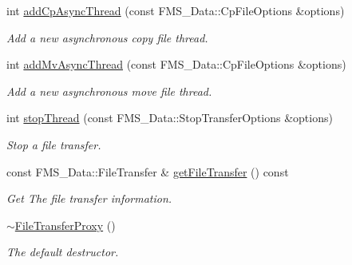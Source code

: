 \begin{DoxyCompactItemize}
int \hyperlink{classFileTransferProxy_a787ee7b8a04b450a0e11fea0d4cf9bb4}{addCpAsyncThread} (const FMS\_\-Data::CpFileOptions \&options)
\begin{DoxyCompactList}\small\item\em Add a new asynchronous copy file thread. \item\end{DoxyCompactList}\item 
int \hyperlink{classFileTransferProxy_a42b158cebb919a88d00d3c21c2c22093}{addMvAsyncThread} (const FMS\_\-Data::CpFileOptions \&options)
\begin{DoxyCompactList}\small\item\em Add a new asynchronous move file thread. \item\end{DoxyCompactList}\item 
int \hyperlink{classFileTransferProxy_a286ffeb697841c8dc6d246ca268c4169}{stopThread} (const FMS\_\-Data::StopTransferOptions \&options)
\begin{DoxyCompactList}\small\item\em Stop a file transfer. \item\end{DoxyCompactList}\item 
const FMS\_\-Data::FileTransfer \& \hyperlink{classFileTransferProxy_a3eddf1b31232a81c9bcc1aa721e09727}{getFileTransfer} () const 
\begin{DoxyCompactList}\small\item\em Get The file transfer information. \item\end{DoxyCompactList}\item 
\hypertarget{classFileTransferProxy_a669be94976afddcb94ac7a1ede281b8a}{
\hyperlink{classFileTransferProxy_a669be94976afddcb94ac7a1ede281b8a}{$\sim$FileTransferProxy} ()}
\label{classFileTransferProxy_a669be94976afddcb94ac7a1ede281b8a}

\begin{DoxyCompactList}\small\item\em The default destructor. \item\end{DoxyCompactList}\end{DoxyCompactItemize}
